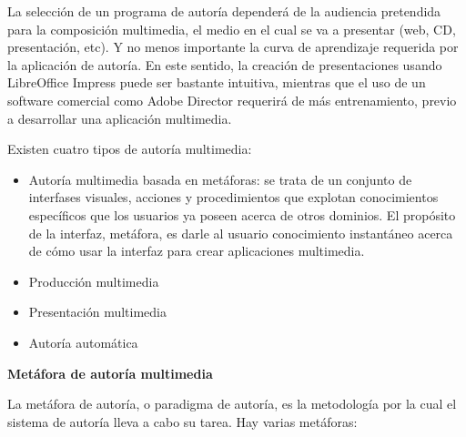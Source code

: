 \documentclass[12pt]{article}
\begin{document}
La selección de un programa de autoría dependerá de la audiencia pretendida
para la composición multimedia, el medio en el cual se va a presentar (web, 
CD, presentación, etc). Y no menos importante la curva de aprendizaje 
requerida por la aplicación de autoría. En este sentido, la creación de 
presentaciones usando LibreOffice Impress puede ser bastante intuitiva, 
mientras que el uso de un software comercial como Adobe Director requerirá
de más entrenamiento, previo a desarrollar una aplicación multimedia.  

Existen cuatro tipos de autoría multimedia: 
\begin{itemize}
\item Autoría multimedia basada en metáforas: se trata de un conjunto de 
interfases visuales, acciones y procedimientos que explotan 
conocimientos específicos que los usuarios ya poseen acerca de otros dominios. 
El propósito de la interfaz, metáfora, es darle al usuario conocimiento 
instantáneo acerca de cómo usar la interfaz para crear aplicaciones multimedia. 
\item Producción multimedia
\item Presentación multimedia 
\item Autoría automática
\end{itemize} 

{\bf Metáfora de autoría multimedia}

La metáfora de autoría, o paradigma de autoría, es la metodología por 
la cual el sistema de autoría lleva a cabo su tarea. Hay varias 
metáforas: 
\end{document}
